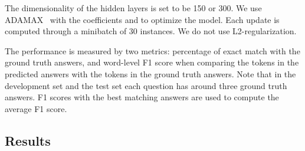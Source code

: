 \documentclass{article} \usepackage{iclr2017_conference,times}
\begin{document}
The dimensionality  of the hidden layers is set to be 150 or 300.
We use ADAMAX~\citep{kingma2014adam:iclr2015} with the coefficients  and  to optimize the model.
Each update is computed through a minibatch of 30 instances.
We do not use L2-regularization.


The performance is measured by two metrics: 
percentage of exact match with the ground truth answers, and word-level F1 score when comparing the tokens in the predicted answers with the tokens in the ground truth answers.
Note that in the development set and the test set each question has around three ground truth answers.
F1 scores with the best matching answers are used to compute the average F1 score.

\subsection{Results}
\end{document}
